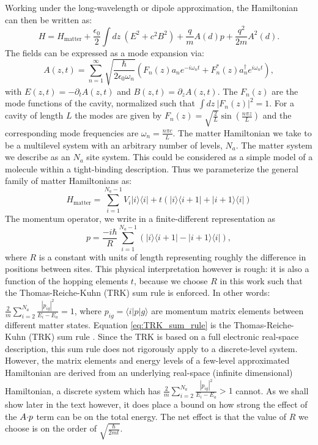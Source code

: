 \documentclass[aps,prl,twocolumn,
	groupedaddress,superscriptaddress,
	amsfonts,amssymb,amsmath,floatfix,
	citeautoscript]{revtex4-1}
\newcommand{\Jadd}[1]{\textcolor{blue}{#1}}
\begin{document}
Working under the long-wavelength or dipole approximation, the Hamiltonian can then be written as:
\begin{equation}\label{eq:hamiltonian}
H = H_{\text{matter}}+\frac{\epsilon_0}{2}\int dz~(E^2+c^2B^2)+\frac{q}{m}A(d)p + \frac{q^2}{2m}A^2(d).
\end{equation}
The fields can be expressed as a mode expansion via:
\begin{equation}\label{eq:mode_expansion}
A(z,t) = \sum\limits_{n=1}^{\infty} \sqrt{\frac{\hbar}{2\epsilon_0\omega_n }}(F_n(z)a_ne^{-i\omega_n t}+F^*_n(z)a_n^{\dagger}e^{i\omega_n t}),
\end{equation}
with $E(z,t) = -\partial_t A(z,t)$ and $B(z,t)=\partial_z A(z,t)$.  The $F_n(z)$ are the mode functions of the cavity, normalized such that $\int dz ~|F_n(z)|^2 = 1$. For a cavity of length $L$ the modes are given by $F_n(z) = \sqrt{\frac{2}{L}}\sin\left(\frac{n\pi z}{L} \right)$ and the corresponding mode frequencies are $\omega_n = \frac{n\pi c}{L}$. The matter Hamiltonian we take to be a multilevel system with an arbitrary number of levels, $N_a$. The matter system we describe as an $N_a$ site system. This could be considered as a simple model of a molecule within a tight-binding description. Thus we parameterize the general family of matter Hamiltonians as:
\begin{equation}\label{eq:matter_hamiltonian}
H_{\text{matter}} = \sum\limits_{i=1}^{{N_a-1}} V_i|i\rangle\langle i|+t(|i\rangle\langle i+1|+|i+1\rangle\langle i|) 
\end{equation}
The momentum operator, we write in a finite-different representation as
\begin{equation}\label{eq:momentum_operator}
p = \frac{-i\hbar}{R}\sum\limits_{i=1}^{N_a-1} \left(|i\rangle\langle i+1|-|i+1\rangle\langle i| \right),
\end{equation}
where $R$ is a constant with units of length representing roughly the difference in positions between sites. This physical interpretation however is rough: it is also a function of the hopping elements $t$, because we choose $R$ in this work such that the Thomas-Reiche-Kuhn (TRK) sum rule is enforced. In other words: $\frac{2}{m}\sum\limits_{i=2}^{N_a}\frac{|p_{ig}|^2}{E_i - E_a} = 1$, where $p_{ig} = \langle i|p|g\rangle$ are momentum matrix elements between different matter states. Equation \ref{eq:TRK_sum_rule} is the Thomas-Reiche-Kuhn (TRK) sum rule \cite{ciuti2005quantum}. Since the TRK is based on a full electronic real-space description, this sum rule does not rigorously apply to a discrete-level system. However, the matrix elements and energy levels of a few-level approximated Hamiltonian  are derived from an underlying real-space (infinite dimensional) Hamiltonian, a discrete system which has  $\frac{2}{m}\sum\limits_{i=2}^{N_a}\frac{|p_{ig}|^2}{E_i - E_a} > 1$ cannot. As we shall show later in the text however, it does place a bound on how strong the effect of the $A\Jadd{\cdot}p$ term can be on the total energy. The net effect is that the value of $R$ we choose is on the order of $\sqrt{\frac{\hbar}{2mt}}$.
\end{document}
